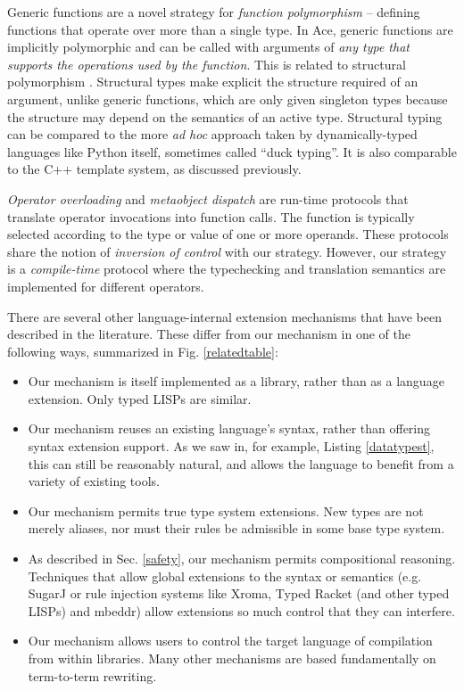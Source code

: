 \documentclass[10pt,preprint]{sigplanconf}
\begin{document}
{Generic functions are a novel strategy for {\it function polymorphism} -- defining functions that operate over more than a single type. In Ace, generic functions are implicitly polymorphic and can be called with arguments of {\it any type that supports the operations used by the function}. This is related to structural polymorphism \cite{malayeri2009structural}. Structural types make explicit the structure required of an argument, unlike generic functions, which are only given singleton types because the structure may depend on the semantics of an active type. 
Structural typing can be compared to the more \emph{ad hoc} approach taken by dynamically-typed languages like Python itself, sometimes called ``duck typing''. It is also comparable to the C++ template system, as discussed previously. 

{\it Operator overloading} \cite{vanWijngaarden:Mailloux:Peck:Koster:Sintzoff:Lindsey:Meertens:Fisker:acta:1975} and {\it metaobject dispatch} \cite{Kiczales91} are run-time protocols that translate operator invocations into function calls. The function is typically selected according to the type or value of one or more operands. These protocols share the notion of {\it inversion of control} with our strategy. However, our strategy is a {\it compile-time} protocol where the typechecking and translation semantics are implemented for different operators. %

There are several other language-internal extension mechanisms that have been described in the literature. These differ from our mechanism in one of the following ways, summarized in Fig. \ref{relatedtable}:
\begin{itemize}
\item Our mechanism is itself implemented as a library, rather than as a language extension. Only typed LISPs are similar.
\item Our mechanism reuses an existing language's syntax, rather than offering syntax extension support. As we saw in, for example, Listing \ref{datatypest}, this can still be reasonably natural, and allows the language to benefit from a variety of existing tools.
\item Our mechanism permits true type system extensions. New types are not merely aliases, nor must their rules be admissible in some base type system.%
\item As described in Sec. \ref{safety}, our mechanism permits compositional reasoning. Techniques that allow global extensions to the syntax or semantics (e.g. SugarJ or rule injection systems like Xroma, Typed Racket (and other typed LISPs) and mbeddr) allow extensions so much control that they can interfere.
\item Our mechanism allows users to control the target language of compilation from within libraries. Many other mechanisms are based fundamentally on term-to-term rewriting.
\end{itemize}

}
\end{document}
